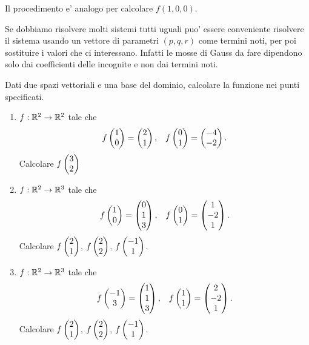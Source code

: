 \begin{example}
    Il procedimento e' analogo per calcolare $f(1, 0, 0)$.
\end{example}

\begin{remark}
    Se dobbiamo risolvere molti sistemi tutti uguali puo' essere conveniente risolvere il sistema usando un vettore di parametri $(p, q, r)$ come termini noti, per poi sostituire i valori che ci interessano. Infatti le mosse di Gauss da fare dipendono solo dai coefficienti delle incognite e non dai termini noti.
\end{remark}

\begin{exercise}
    Dati due spazi vettoriali e una base del dominio, calcolare la funzione nei punti specificati.

    \begin{enumerate}[(1)]
        \item $f : \mathbb{R}^2 \to \mathbb{R}^2$ tale che \begin{align*}
            f\begin{pmatrix} 1\\0 \end{pmatrix} = \begin{pmatrix} 2\\1 \end{pmatrix}, &&f\begin{pmatrix} 0\\1 \end{pmatrix} = \begin{pmatrix} -4\\-2 \end{pmatrix}.
        \end{align*}
        Calcolare $f\begin{pmatrix} 3\\2 \end{pmatrix}$
        \item $f : \mathbb{R}^2 \to \mathbb{R}^3$ tale che \begin{align*}
            f\begin{pmatrix} 1\\0 \end{pmatrix} = \begin{pmatrix} 0\\1\\3 \end{pmatrix}, &&f\begin{pmatrix} 0\\1 \end{pmatrix} = \begin{pmatrix} 1\\-2\\1 \end{pmatrix}.
        \end{align*}
        Calcolare $f\begin{pmatrix} 2\\1 \end{pmatrix}$, $f\begin{pmatrix} 2\\2 \end{pmatrix}$, $f\begin{pmatrix} -1\\1 \end{pmatrix}$. 
        \item $f : \mathbb{R}^2 \to \mathbb{R}^3$ tale che \begin{align*}
            f\begin{pmatrix} -1\\3 \end{pmatrix} = \begin{pmatrix} 1\\1\\3 \end{pmatrix}, &&f\begin{pmatrix} 1\\1 \end{pmatrix} = \begin{pmatrix} 2\\-2\\1 \end{pmatrix}.
        \end{align*}
        Calcolare $f\begin{pmatrix} 2\\1 \end{pmatrix}$, $f\begin{pmatrix} 2\\2 \end{pmatrix}$, $f\begin{pmatrix} -1\\1 \end{pmatrix}$.

\end{enumerate}
\end{exercise}
